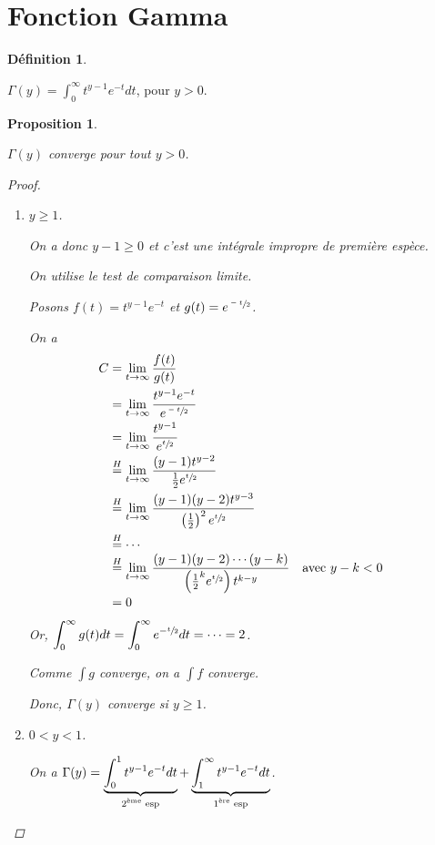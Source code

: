 \documentclass{report}
\newcommand*{\dlim}[3]{\displaystyle\lim_{#1 \to #2}#3}
\newcommand*{\dint}[3]{\displaystyle\int_{#1}^{#2}#3}
\newcommand*{\gte}{\geqslant}
\newtheorem*{prop}{Proposition}
\theoremstyle{definition}
\newtheorem*{defin}{D\'efinition}
\theoremstyle{remark}
\begin{document}
	\section{Fonction Gamma}
	\begin{defin}~

		$\Gamma(y) = \dint{0}{\infty}{t^{y-1}e^{-t} dt}$, pour $y>0$.
	\end{defin}
	\begin{prop}~

		$\Gamma(y)$ converge pour tout $y>0$.
		\begin{proof}~

			\begin{enumerate}
				\item $y \gte 1$.

				On a donc $y-1 \gte 0$ et c'est une int\'egrale impropre de premi\`ere esp\`ece.

				On utilise le test de comparaison limite.

				Posons $f(t) = t^{y-1}e^{-t}$ et $g(t) = e^{\sfrac{-t}{2}}$.

				On a
				\begin{align*}
					C&= \dlim{t}{\infty}{\dfrac{f(t)}{g(t)}}\\
					&= \dlim{t}{\infty}{\dfrac{t^{y-1}e^{-t}}{e^{\sfrac{-t}{2}}}}\\
					&= \dlim{t}{\infty}{\dfrac{t^{y-1}}{e^{\sfrac{t}{2}}}}\\
					&\overset{H}{=} \dlim{t}{\infty}{\dfrac{(y-1)t^{y-2}}{\frac{1}{2}e^{\sfrac{t}{2}}}}\\
					&\overset{H}{=} \dlim{t}{\infty}{\dfrac{(y-1)(y-2)t^{y-3}}{\left(\frac{1}{2}\right)^2e^{\sfrac{t}{2}}}}\\
					&\overset{H}{=} \dotsb\\
					&\overset{H}{=} \dlim{t}{\infty}{\dfrac{(y-1)(y-2)\dotsb(y-k)}{\left(\frac{1}{2}^ke^{\sfrac{t}{2}}\right)t^{k-y}}}&\text{avec }y-k&<0\\
					&= 0
				\end{align*}

				Or, $\dint{0}{\infty}{g(t) dt} = \dint{0}{\infty}{e^{-\sfrac{t}{2}} dt} = \dotsb = 2$.

				Comme $\int g$ converge, on a $\int f$ converge.

				Donc, $\Gamma(y)$ converge si $y \gte 1$.
				\item $0<y<1$.

				On a $\Gamma(y) = \underbrace{\dint{0}{1}{t^{y-1}e^{-t} dt}}_{\text{2\textsuperscript{\`eme} esp}} + \underbrace{\dint{1}{\infty}{t^{y-1}e^{-t} dt}}_{\text{1\textsuperscript{\`ere} esp}}$.


\end{enumerate}
\end{proof}
\end{prop}
\end{document}
